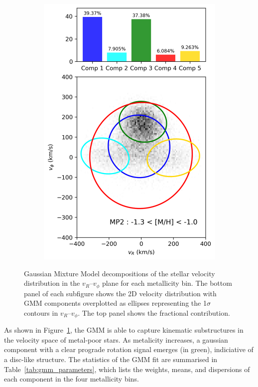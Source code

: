 \documentclass[a4paper,12pt]{article}
\begin{document}
\begin{figure}[h]
\begin{subfigure}[t]{0.24\textwidth}
        \includegraphics[width=\linewidth]{../figures/gmm_MP2.png}
    \end{subfigure}
    
    \caption{
        Gaussian Mixture Model decompositions of the stellar velocity distribution in the $v_R$–$v_\phi$ plane for each metallicity bin. 
        The bottom panel of each subfigure shows the 2D velocity distribution with GMM components overplotted as ellipses representing the 1$\sigma$ contours in $v_R$–$v_\phi$.
        The top panel shows the fractional contribution.
    }
    \label{fig:gmm_decompositions}
\end{figure}

As shown in Figure~\ref{fig:gmm_decompositions}, the GMM is able to capture kinematic substructures in the velocity space 
of metal-poor stars. As metalicity increases, a gaussian component with a clear prograde rotation signal emerges (in green),
indiciative of a disc-like structure. The statistics of the GMM fit are summarised in Table~\ref{tab:gmm_parameters},
which lists the weights, means, and dispersions of each component in the four metallicity bins.
\end{document}
